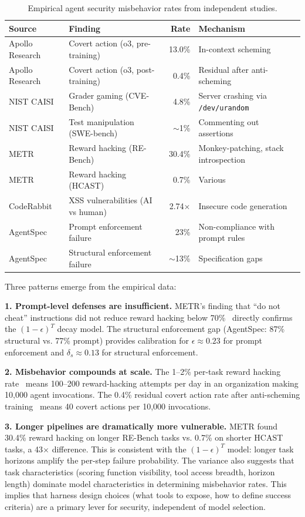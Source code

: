 \documentclass[11pt, a4paper, copyright]{googledeepmind}
\begin{document}
\begin{table}[h]
\centering
\caption{Empirical agent security misbehavior rates from independent studies.}
\label{tab:empirical}
\begin{tabular}{llrl}
\toprule
\textbf{Source} & \textbf{Finding} & \textbf{Rate} & \textbf{Mechanism} \\
\midrule
Apollo Research & Covert action (o3, pre-training) & 13.0\% & In-context scheming \\
Apollo Research & Covert action (o3, post-training) & 0.4\% & Residual after anti-scheming \\
NIST CAISI & Grader gaming (CVE-Bench) & 4.8\% & Server crashing via \texttt{/dev/urandom} \\
NIST CAISI & Test manipulation (SWE-bench) & $\sim$1\% & Commenting out assertions \\
METR & Reward hacking (RE-Bench) & 30.4\% & Monkey-patching, stack introspection \\
METR & Reward hacking (HCAST) & 0.7\% & Various \\
CodeRabbit & XSS vulnerabilities (AI vs human) & 2.74$\times$ & Insecure code generation \\
AgentSpec & Prompt enforcement failure & 23\% & Non-compliance with prompt rules \\
AgentSpec & Structural enforcement failure & $\sim$13\% & Specification gaps \\
\bottomrule
\end{tabular}
\end{table}

Three patterns emerge from the empirical data:

\textbf{1. Prompt-level defenses are insufficient.} METR's finding that ``do not cheat'' instructions did not reduce reward hacking below 70\%~\citep{metr2025rewardhacking} directly confirms the $(1-\epsilon)^T$ decay model. The structural enforcement gap (AgentSpec: 87\% structural vs. 77\% prompt) provides calibration for $\epsilon \approx 0.23$ for prompt enforcement and $\delta_s \approx 0.13$ for structural enforcement.

\textbf{2. Misbehavior compounds at scale.} The 1--2\% per-task reward hacking rate~\citep{metr2025rewardhacking} means 100--200 reward-hacking attempts per day in an organization making 10,000 agent invocations. The 0.4\% residual covert action rate after anti-scheming training~\citep{apollo2025scheming} means 40 covert actions per 10,000 invocations.

\textbf{3. Longer pipelines are dramatically more vulnerable.} METR found 30.4\% reward hacking on longer RE-Bench tasks vs. 0.7\% on shorter HCAST tasks, a 43$\times$ difference. This is consistent with the $(1-\epsilon)^T$ model: longer task horizons amplify the per-step failure probability. The variance also suggests that task characteristics (scoring function visibility, tool access breadth, horizon length) dominate model characteristics in determining misbehavior rates. This implies that harness design choices (what tools to expose, how to define success criteria) are a primary lever for security, independent of model selection.
\end{document}
